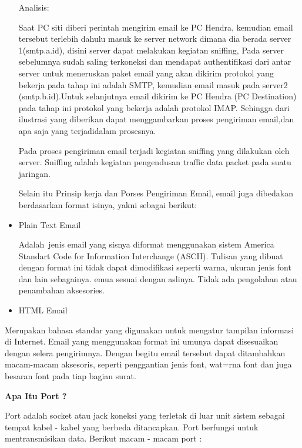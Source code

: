 \begin{itemize}
\vspace{12pt}
Analisis: \par
Saat PC siti diberi perintah mengirim email ke PC Hendra, kemudian email tersebut terlebih dahulu masuk ke server network dimana dia berada server 1(smtp.a.id), disini server dapat melakukan kegiatan sniffing, Pada server sebelumnya sudah saling terkoneksi dan mendapat authentifikasi dari antar server untuk meneruskan paket email yang akan dikirim protokol yang bekerja pada tahap ini adalah SMTP, kemudian email masuk pada server2 (smtp.b.id).Untuk selanjutnya email dikirim ke PC Hendra (PC Destination) pada tahap ini protokol yang bekerja adalah protokol IMAP. Sehingga dari ilustrasi yang diberikan dapat menggambarkan proses pengiriman email,dan apa saja yang terjadidalam prosesnya. \par
\vspace{12pt}
Pada proses pengiriman email terjadi kegiatan sniffing yang dilakukan oleh server. Sniffing adalah kegiatan pengendusan traffic data packet pada suatu jaringan. \par
\vspace{12pt}
Selain itu Prinsip kerja dan Porses Pengiriman Email, email juga dibedakan berdasarkan format isinya, yakni sebagai berikut: \par
\vspace{12pt}
\noindent 
\item Plain Text Email \par
Adalah~jenis email yang sisnya diformat menggunakan sistem America  Standart Code for Information Interchange (ASCII). Tulisan yang dibuat dengan format ini tidak dapat dimodifikasi seperti warna, ukuran jenis font dan lain sebagainya. emua sesuai dengan aslinya. Tidak ada pengolahan atau penambahan aksesories. \par
\noindent 
\item HTML Email\end{itemize}
 \par
Merupakan bahasa standar yang digunakan untuk mengatur tampilan informasi di Internet. Email yang menggunakan format ini umunya dapat disesuaikan dengan selera pengirimnya. Dengan begitu email tersebut dapat ditambahkan macam-macam aksesoris, seperti penggantian jenis font, wat=rna font dan juga besaran font pada tiap bagian surat. \par
\vspace{12pt}
\noindent 
\textbf{Apa Itu Port ?} \par
Port adalah socket atau jack koneksi yang terletak di luar unit sistem sebagai tempat kabel - kabel yang berbeda ditancapkan. Port berfungsi untuk mentransmisikan data. Berikut macam - macam port : \par
